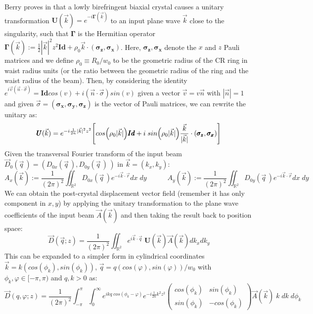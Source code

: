 \documentclass[11pt, a4paper, twoside]{article} %
\newcommand{\R}{\mathbb{R}} %
\begin{document}
Berry proves in \cite{Berry, BerryJeffrey} that a lowly birefringent biaxial crystal causes a unitary transformation $\pmb{U}(\vec{k})=e^{-i\pmb{\Gamma}(\vec{k})}$ to an input plane wave $\vec{k}$ close to the singularity, such that $\pmb{\Gamma}$ is the Hermitian operator $\pmb{\Gamma}(\vec{k}):=\frac{1}{2}|\vec{k}|^2z^2\pmb{Id}+\rho_0\vec{k}\cdot (\pmb{\sigma_z}, \pmb{\sigma_x})$. Here, $\pmb{\sigma_z}, \pmb{\sigma_x}$ denote the $x$ and $z$ Pauli matrices and we define $\rho_0\equiv R_0/w_0$ to be the geometric radius of the CR ring in waist radius units (or the ratio between the geometric radius of the ring and the waist radius of the beam). Then, by considering the identity $e^{i\vec{v}(\vec{n}\cdot \vec{\sigma})}=\pmb{Id}cos(v)+i(\vec{n}\cdot \vec{\sigma}) sin(v)$ given a vector $\vec{v}=v\vec{n}$ with $|\vec{n}|=1$ and given $\vec{\sigma}=(\pmb{\sigma_x},\pmb{\sigma_y},\pmb{\sigma_z})$ is the vector of Pauli matrices, we can rewrite the unitary as:
\begin{equation}
\pmb{U}(\vec{k}) = e^{-i\frac{1}{2n}|\vec{k}|^2z^2}\qty[cos\qty(\rho_0|\vec{k}|)\pmb{Id}+i\;sin\qty(\rho_0|\vec{k}|)\frac{\vec{k}}{|\vec{k}|}\cdot (\pmb{\sigma_z},\pmb{\sigma_x})]
\end{equation}
Given the transversal Fourier transform of the input beam $\vec{D}_0(\vec{q}\,)=(D_{0x}(\vec{q}\,), D_{0y}(\vec{q}\,)\,)$ in $\vec{k}=(k_x,k_y)$:
\begin{equation}
A_x(\vec{k}):=\frac{1}{(2\pi)^2}\iint_{\R^2} D_{0x}(\vec{q}\,)e^{-i\vec{k}\cdot\vec{r}}dx\;dy \quad \quad \quad A_y(\vec{k}):=\frac{1}{(2\pi)^2}\iint_{\R^2} D_{0y}(\vec{q}\,)e^{-i\vec{k}\cdot\vec{r}}dx\;dy
\end{equation}
We can obtain the post-crystal displacement vector field (remember it has only component in $x,y$) by applying the unitary transformation to the plane wave coefficients of the input beam $\vec{A}(\vec{k})$ and then taking the result back to position space:
\begin{equation}
\vec{D}(\vec{q};z)=\frac{1}{(2\pi)^2}\iint_{\R^2}e^{i\vec{k}\cdot\vec{q}}\;\pmb{U}(\vec{k})\vec{A}(\vec{k})dk_xdk_y
\end{equation}
This can be expanded to a simpler form in cylindrical coordinates $\vec{k}=k(cos(\phi_k),sin(\phi_k))$, $\vec{q}=q(cos(\varphi), sin(\varphi))/w_0$ with $\phi_k,\varphi\in[-\pi,\pi)$ and $q,k>0$ as:
\begin{equation}\label{geez}
\vec{D}(q,\varphi;z)=\frac{1}{(2\pi)^2}\int_{-\pi}^{\pi}\int_{0}^\infty e^{ikq \;cos(\phi_k-\varphi)}e^{-i\frac{1}{2n}k^2z^2}\begin{pmatrix}
cos(\phi_k) & sin(\phi_k)\\
sin(\phi_k) & -cos(\phi_k)
\end{pmatrix} \vec{A}(\vec{k})\;k\;dk\;d\phi_k
\end{equation}
\end{document}
